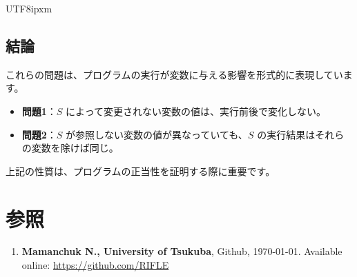 \documentclass[12pt,a4paper]{article}
\begin{document}
\begin{CJK}{UTF8}{ipxm}
\subsection*{結論}

これらの問題は、プログラムの実行が変数に与える影響を形式的に表現しています。

\begin{itemize}
    \item \textbf{問題1}：$S$ によって変更されない変数の値は、実行前後で変化しない。
    \item \textbf{問題2}：$S$ が参照しない変数の値が異なっていても、$S$ の実行結果はそれらの変数を除けば同じ。
\end{itemize}

上記の性質は、プログラムの正当性を証明する際に重要です。



\section*{参照}
\begin{enumerate}
    \item \textbf{Mamanchuk N., University of Tsukuba}, Github, \today. Available online: \url{https://github.com/RIFLE}
\end{enumerate}


\end{CJK}
\end{document}
